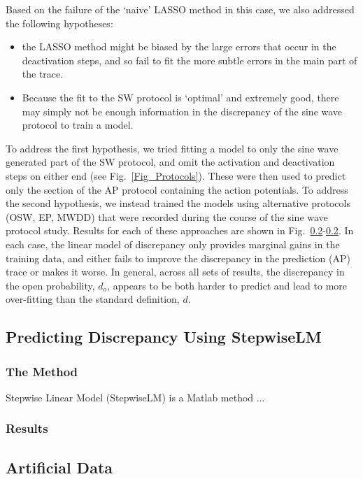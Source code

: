 \documentclass[11pt,a4paper,oneside]{article}
\begin{document}
Based on the failure of the `naive' LASSO method in this case, we also addressed the following hypotheses:
\begin{itemize}
\item the LASSO method might be biased by the large errors that occur in the deactivation steps, and so fail to fit the more subtle errors in the main part of the trace.
\item Because the fit to the SW protocol is `optimal' and  extremely good, there may simply not be enough information in the discrepancy of the sine wave protocol to train a model.
\end{itemize}

To address the first hypothesis, we tried fitting a model to only the sine wave generated part of the SW protocol, and omit the activation and deactivation steps on either end (see Fig.~\ref{Fig_Protocols}). These were then used to predict only the section of the AP protocol containing the action potentials. To address the second hypothesis, we instead trained the models using alternative protocols (OSW, EP, MWDD) that were recorded during the course of the sine wave protocol study. Results for each of these approaches are shown in Fig.~\ref{}-\ref{}. In each case, the linear model of discrepancy only provides marginal gains in the training data, and either fails to improve the discrepancy in the prediction (AP) trace or makes it worse. In general, across all sets of results, the discrepancy in the open probability, $d_o$, appears to be both harder to predict and lead to more over-fitting than the standard definition, $d$.

\subsection{Predicting Discrepancy Using StepwiseLM}\label{SubSec_StepwiseLM_Discrepancy}
\subsubsection{The Method}
Stepwise Linear Model (StepwiseLM) is a Matlab method ...
\subsubsection{Results}

\subsection{Artificial Data}
\end{document}
